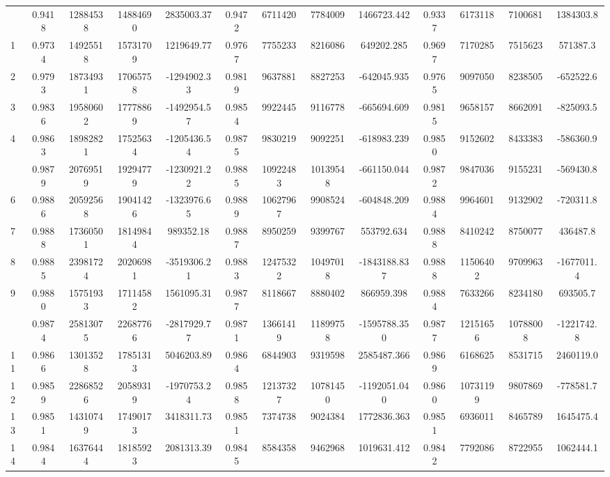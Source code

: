 \documentclass[
  12pt,
]{article}
\begin{document}
\begin{longtable}[t]{lcccccccccccc}
\endfoot
\bottomrule
\endlastfoot
0 & 0.9418 & 12884538 & 14884690 & 2835003.37 & 0.9472 & 6711420 & 7784009 & 1466723.442 & 0.9337 & 6173118 & 7100681 & 1384303.8\\
1 & 0.9734 & 14925518 & 15731709 & 1219649.77 & 0.9767 & 7755233 & 8216086 & 649202.285 & 0.9697 & 7170285 & 7515623 & 571387.3\\
2 & 0.9793 & 18734931 & 17065758 & -1294902.33 & 0.9819 & 9637881 & 8827253 & -642045.935 & 0.9765 & 9097050 & 8238505 & -652522.6\\
3 & 0.9836 & 19580602 & 17778869 & -1492954.57 & 0.9854 & 9922445 & 9116778 & -665694.609 & 0.9815 & 9658157 & 8662091 & -825093.5\\
4 & 0.9863 & 18982821 & 17525634 & -1205436.54 & 0.9875 & 9830219 & 9092251 & -618983.239 & 0.9850 & 9152602 & 8433383 & -586360.9\\
\addlinespace
5 & 0.9879 & 20769519 & 19294779 & -1230921.22 & 0.9885 & 10922483 & 10139548 & -661150.044 & 0.9872 & 9847036 & 9155231 & -569430.8\\
6 & 0.9886 & 20592568 & 19041426 & -1323976.65 & 0.9889 & 10627967 & 9908524 & -604848.209 & 0.9884 & 9964601 & 9132902 & -720311.8\\
7 & 0.9888 & 17360501 & 18149844 & 989352.18 & 0.9887 & 8950259 & 9399767 & 553792.634 & 0.9888 & 8410242 & 8750077 & 436487.8\\
8 & 0.9885 & 23981724 & 20206981 & -3519306.21 & 0.9883 & 12475322 & 10497018 & -1843188.837 & 0.9888 & 11506402 & 9709963 & -1677011.4\\
9 & 0.9880 & 15751933 & 17114582 & 1561095.31 & 0.9877 & 8118667 & 8880402 & 866959.398 & 0.9884 & 7633266 & 8234180 & 693505.7\\
\addlinespace
10 & 0.9874 & 25813075 & 22687766 & -2817929.77 & 0.9871 & 13661419 & 11899758 & -1595788.350 & 0.9877 & 12151656 & 10788008 & -1221742.8\\
11 & 0.9866 & 13013528 & 17851313 & 5046203.89 & 0.9864 & 6844903 & 9319598 & 2585487.366 & 0.9869 & 6168625 & 8531715 & 2460119.0\\
12 & 0.9859 & 22868526 & 20589319 & -1970753.24 & 0.9858 & 12137327 & 10781450 & -1192051.040 & 0.9860 & 10731199 & 9807869 & -778581.7\\
13 & 0.9851 & 14310749 & 17490173 & 3418311.73 & 0.9851 & 7374738 & 9024384 & 1772836.363 & 0.9851 & 6936011 & 8465789 & 1645475.4\\
14 & 0.9844 & 16376444 & 18185923 & 2081313.39 & 0.9845 & 8584358 & 9462968 & 1019631.412 & 0.9842 & 7792086 & 8722955 & 1062444.1\\

\end{longtable}
\end{document}

